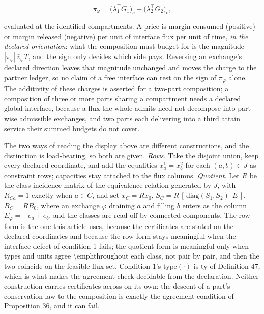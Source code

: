 \documentclass[11pt]{article}
\begin{document}
$$\pi_\varphi = \bigl(\lambda_1^{\top} G_1\bigr)_c - \bigl(\lambda_2^{\top} G_2\bigr)_c ,$$

 evaluated at the identified compartments. A price is margin consumed (positive) or margin released (negative) per unit of interface flux per unit of time, \emph{in the declared orientation}: what the composition must budget for is the magnitude \(|\pi_\varphi|\,\allowbreak{}\bar v_\varphi T\), and the sign only decides which side pays. Reversing an exchange's declared direction leaves that magnitude unchanged and moves the charge to the partner ledger, so no claim of a free interface can rest on the sign of \(\pi_\varphi\) alone. The additivity of these charges is asserted for a two-part composition; a composition of three or more parts sharing a compartment needs a declared global interface, because a flux the whole admits need not decompose into part-wise admissible exchanges, and two parts each delivering into a third attain service their summed budgets do not cover.

The two ways of reading the display above are different constructions, and the distinction is load-bearing, so both are given. \emph{Rows.} Take the disjoint union, keep every declared coordinate, and add the equalities \(x_a^1 = x_b^2\) for each \((a,b) \in J\) as constraint rows; capacities stay attached to the flux columns. \emph{Quotient.} Let \(R\) be the class-incidence matrix of the equivalence relation generated by \(J\), with \(R_{Ca} = 1\) exactly when \(a \in C\), and set \(x_C = R x_0\), \(S_C =\allowbreak{} R\,\allowbreak{}[\,\allowbreak{}\mathrm{diag}(S_1,\allowbreak{} S_2)\ \ E\,\allowbreak{}]\), \(B_C = R B_0\), where an exchange \(\varphi\) draining \(a\) and filling \(b\) enters as the column \(E_\varphi = -e_a + e_b\), and the classes are read off by connected components. The row form is the one this article uses, because the certificates are stated on the declared coordinates and because the row form stays meaningful when the interface defect of condition 1 fails; the quotient form is meaningful only when types and units agree \textbackslash{}emph{throughout} each class, not pair by pair, and then the two coincide on the feasible flux set. Condition 1's \(\mathrm{type}(\cdot)\) is \(\mathrm{ty}\) of Definition 47, which is what makes the agreement check decidable from the declaration. Neither construction carries certificates across on its own: the descent of a part's conservation law to the composition is exactly the agreement condition of Proposition 36, and it can fail.
\end{document}
